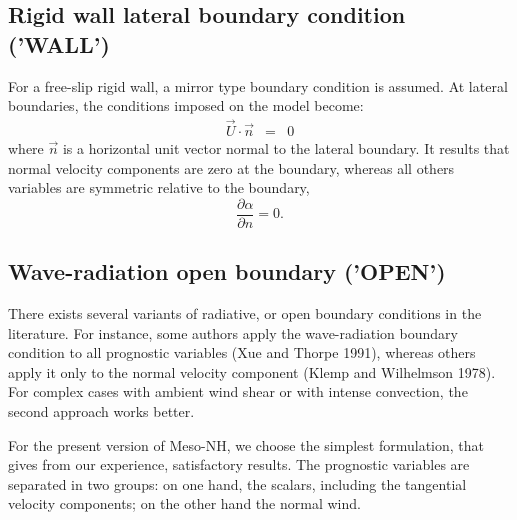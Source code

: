 \subsection{Rigid wall lateral boundary condition ('WALL')}

 For a free-slip rigid wall, a mirror type boundary condition is assumed.
At lateral boundaries, the conditions imposed on the model become:
\begin{eqnarray}
\vec{U}\cdot\vec{n}&=&0
\end{eqnarray}
where $\vec{n}$ is a horizontal unit vector normal to the lateral boundary.
 It results that normal velocity components are zero at the boundary,
whereas all others variables are symmetric relative to the boundary,
\begin{equation}
\dfrac{\partial \alpha }{\partial n }=0.
\end{equation}

\subsection{Wave-radiation open boundary ('OPEN')}

There exists several variants of radiative, or open boundary conditions
in the literature.  For instance, some authors apply the wave-radiation
boundary condition to all prognostic variables
(Xue and Thorpe 1991), whereas others apply it only to the normal
velocity component (Klemp and Wilhelmson 1978). For complex cases
with ambient wind shear or with intense convection, the second approach
works better.

For the present version of Meso-NH, we choose the simplest
formulation, that gives from our experience, satisfactory results.
The prognostic variables are separated in two groups: on one hand, the
scalars, including the tangential velocity components; on the other hand
the normal wind.

